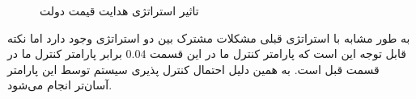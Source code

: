 \documentclass[13pt,onecolumn,a4paper]{article}
\begin{document}
\begin{figure}[H]
	\centering
	\hfil
	
	\medskip
	\hfil
	
	\caption{تاثیر استراتژی هدایت قیمت دولت}
	\label{fig:myfigure}
\end{figure}
به طور مشابه با استراتژی قبلی مشکلات مشترک بین دو استراتژی وجود دارد اما نکته قابل توجه این است که پارامتر کنترل ما در این قسمت $0.04$ برابر پارامتر کنترل ما در قسمت قبل است. به همین دلیل احتمال کنترل پذیری سیستم توسط این پارامتر آسان‌تر انجام می‌شود.
\end{document}
